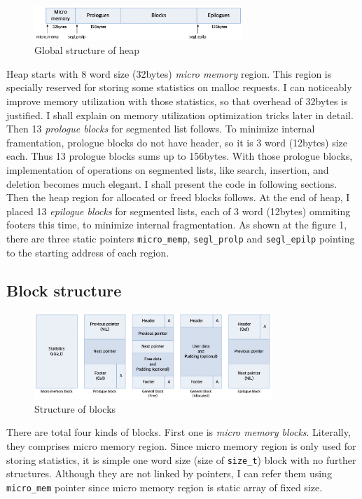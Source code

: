 \documentclass[fleqn]{article}
\begin{document}
\begin{figure}[ht!]
    \centering
    \includegraphics[width = 0.7\textwidth]{global_struct}
    \caption{Global structure of heap}
\end{figure}

Heap starts with 8 word size (32bytes) \textit{micro memory} region. This region is specially reserved for storing some statistics on malloc requests. I can noticeably improve memory utilization with those statistics, so that overhead of 32bytes is justified. I shall explain on memory utilization optimization tricks later in detail. Then 13 \textit{prologue blocks} for segmented list follows. To minimize internal framentation, prologue blocks do not have header, so it is 3 word (12bytes) size each. Thus 13 prologue blocks sums up to 156bytes. With those prologue blocks, implementation of operations on segmented lists, like search, insertion, and deletion becomes much elegant. I shall present the code in following sections. Then the heap region for allocated or freed blocks follows. At the end of heap, I placed 13 \textit{epilogue blocks} for segmented lists, each of 3 word (12bytes) ommiting footers this time, to minimize internal fragmentation. As shown at the figure 1, there are three static pointers \texttt{micro\_memp}, \texttt{segl\_prolp} and \texttt{segl\_epilp} pointing to the starting address of each region.

\subsection{Block structure}

\begin{figure}[ht!]
    \centering
    \includegraphics[width = 0.8\textwidth]{block_struct}
    \caption{Structure of blocks}
\end{figure}

There are total four kinds of blocks. First one is \textit{micro memory blocks}. Literally, they comprises micro memory region. Since micro memory region is only used for storing statistics, it is simple one word size (size of \texttt{size\_t}) block with no further structures. Although they are not linked by pointers, I can refer them using \texttt{micro\_mem} pointer since micro memory region is static array of fixed size.
\end{document}
